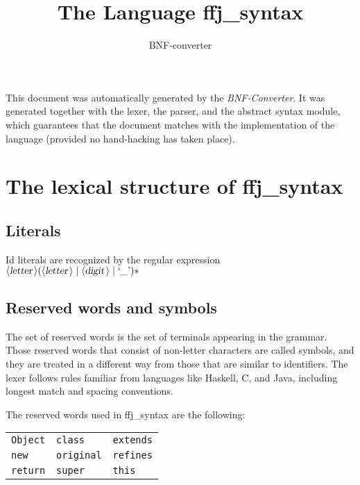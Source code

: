 \documentclass[a4paper,11pt]{article}
\author{BNF-converter}
\title{The Language ffj_syntax}
\begin{document}
\maketitle

\newcommand{\emptyP}{\mbox{$\epsilon$}}
\newcommand{\terminal}[1]{\mbox{{\texttt {#1}}}}
\newcommand{\nonterminal}[1]{\mbox{$\langle \mbox{{\sl #1 }} \! \rangle$}}
\newcommand{\arrow}{\mbox{::=}}
\newcommand{\delimit}{\mbox{$|$}}
\newcommand{\reserved}[1]{\mbox{{\texttt {#1}}}}
\newcommand{\literal}[1]{\mbox{{\texttt {#1}}}}
\newcommand{\symb}[1]{\mbox{{\texttt {#1}}}}

This document was automatically generated by the {\em BNF-Converter}. It was generated together with the lexer, the parser, and the abstract syntax module, which guarantees that the document matches with the implementation of the language (provided no hand-hacking has taken place).

\section*{The lexical structure of ffj_syntax}

\subsection*{Literals}


Id literals are recognized by the regular expression
\({\nonterminal{letter}} ({\nonterminal{letter}} \mid {\nonterminal{digit}} \mid \mbox{`\_'})*\)


\subsection*{Reserved words and symbols}
The set of reserved words is the set of terminals appearing in the grammar. Those reserved words that consist of non-letter characters are called symbols, and they are treated in a different way from those that are similar to identifiers. The lexer follows rules familiar from languages like Haskell, C, and Java, including longest match and spacing conventions.

The reserved words used in ffj_syntax are the following: \\

\begin{tabular}{lll}
{\reserved{Object}} &{\reserved{class}} &{\reserved{extends}} \\
{\reserved{new}} &{\reserved{original}} &{\reserved{refines}} \\
{\reserved{return}} &{\reserved{super}} &{\reserved{this}} \\
\end{tabular}\\
\end{document}
